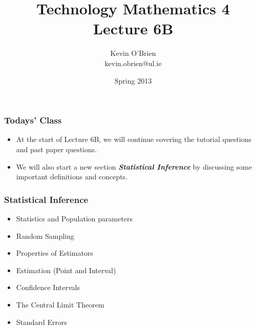 \documentclass[a4]{beamer}
\title[MA4704]{Technology Mathematics 4 \\ {\normalsize Lecture 6B}}
\author[Kevin O'Brien]{Kevin O'Brien \\ {\scriptsize kevin.obrien@ul.ie}}
\date{Spring 2013}
\institute[Maths \& Stats]{Dept. of Mathematics \& Statistics, \\ University \textit{of} Limerick}
\begin{document}
\begin{frame}
\titlepage
\end{frame}

\begin{frame}
\frametitle{Todays' Class}

\begin{itemize}
\item At the start of Lecture 6B, we will continue covering the tutorial questions and past paper questions.
\item We will also start a new section \textbf{\textit{Statistical Inference}} by discussing some important definitions and concepts.
\end{itemize}
\end{frame}
\begin{frame}
\frametitle{Statistical Inference}

\begin{itemize}
\item Statistics and Population parameters
\item Random Sampling
\item Properties of Estimators
\item Estimation (Point and Interval)
\item Confidence Intervals
\item The Central Limit Theorem
\item Standard Errors
\end{itemize}


\end{frame}


\end{document}
